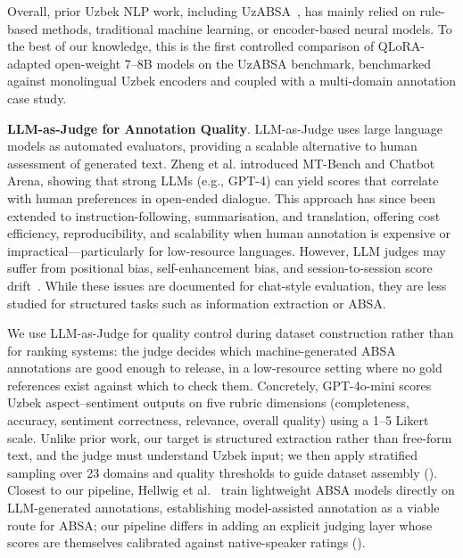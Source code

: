 \documentclass[bdcc,article,submit,moreauthors]{Definitions/mdpi}
\begin{document}
Overall, prior Uzbek NLP work, including UzABSA~\cite{matlatipov-etal-2024-uzabsa}, has mainly relied on rule-based methods, traditional machine learning, or encoder-based neural models. To the best of our knowledge, this is the first controlled comparison of QLoRA-adapted open-weight 7--8B models on the UzABSA benchmark, benchmarked against monolingual Uzbek encoders and coupled with a multi-domain annotation case study.%

\label{sec:rw_judge}
\textbf{LLM-as-Judge for Annotation Quality}. LLM-as-Judge uses large language models as automated evaluators, providing a scalable alternative to human assessment of generated text. Zheng et al.\cite{3666122.3668142} introduced MT-Bench and Chatbot Arena, showing that strong LLMs (e.g., GPT-4) can yield scores that correlate with human preferences in open-ended dialogue. This approach has since been extended to instruction-following, summarisation, and translation, offering cost efficiency, reproducibility, and scalability when human annotation is expensive or impractical---particularly for low-resource languages. However, LLM judges may suffer from positional bias, self-enhancement bias, and session-to-session score drift~\cite{2506.22316}. While these issues are documented for chat-style evaluation, they are less studied for structured tasks such as information extraction or ABSA.

We use LLM-as-Judge for quality control during dataset construction rather than for ranking systems: the judge decides which machine-generated ABSA annotations are good enough to release, in a low-resource setting where no gold references exist against which to check them. Concretely, GPT-4o-mini scores Uzbek aspect--sentiment outputs on five rubric dimensions (completeness, accuracy, sentiment correctness, relevance, overall quality) using a 1--5 Likert scale. Unlike prior work, our target is structured extraction rather than free-form text, and the judge must understand Uzbek input; we then apply stratified sampling over 23 domains and quality thresholds to guide dataset assembly (). Closest to our pipeline, Hellwig et al.~\cite{hellwig-etal-2026-llm} train lightweight ABSA models directly on LLM-generated annotations, establishing model-assisted annotation as a viable route for ABSA; our pipeline differs in adding an explicit judging layer whose scores are themselves calibrated against native-speaker ratings ().
\end{document}
